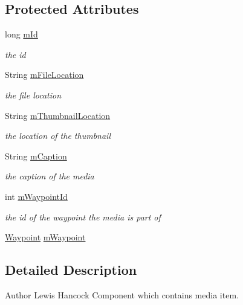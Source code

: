 \subsection*{Protected Attributes}
\begin{DoxyCompactItemize}
\item 
long \hyperlink{classuk_1_1ac_1_1swan_1_1digitaltrails_1_1components_1_1_media_a917af7834f1c738f7db4b9c4aa63c591}{m\+Id}
\begin{DoxyCompactList}\small\item\em the id \end{DoxyCompactList}\item 
String \hyperlink{classuk_1_1ac_1_1swan_1_1digitaltrails_1_1components_1_1_media_adca9e1c69acc1e40cbc0903bb647dbf7}{m\+File\+Location}
\begin{DoxyCompactList}\small\item\em the file location \end{DoxyCompactList}\item 
String \hyperlink{classuk_1_1ac_1_1swan_1_1digitaltrails_1_1components_1_1_media_a50f6550300077e923c98c13bc892a14f}{m\+Thumbnail\+Location}
\begin{DoxyCompactList}\small\item\em the location of the thumbnail \end{DoxyCompactList}\item 
String \hyperlink{classuk_1_1ac_1_1swan_1_1digitaltrails_1_1components_1_1_media_a06f8429d27ef6eb5d90b60d38abb9e7e}{m\+Caption}
\begin{DoxyCompactList}\small\item\em the caption of the media \end{DoxyCompactList}\item 
int \hyperlink{classuk_1_1ac_1_1swan_1_1digitaltrails_1_1components_1_1_media_a4c8b01f28e5c33695b745849f3c72dc4}{m\+Waypoint\+Id}
\begin{DoxyCompactList}\small\item\em the id of the waypoint the media is part of \end{DoxyCompactList}\item 
\hyperlink{classuk_1_1ac_1_1swan_1_1digitaltrails_1_1components_1_1_waypoint}{Waypoint} \hyperlink{classuk_1_1ac_1_1swan_1_1digitaltrails_1_1components_1_1_media_a0ea3d744cb900324ba748a2c7604dc19}{m\+Waypoint}
\end{DoxyCompactItemize}


\subsection{Detailed Description}
\begin{DoxyAuthor}{Author}
Lewis Hancock Component which contains media item. 
\end{DoxyAuthor}


